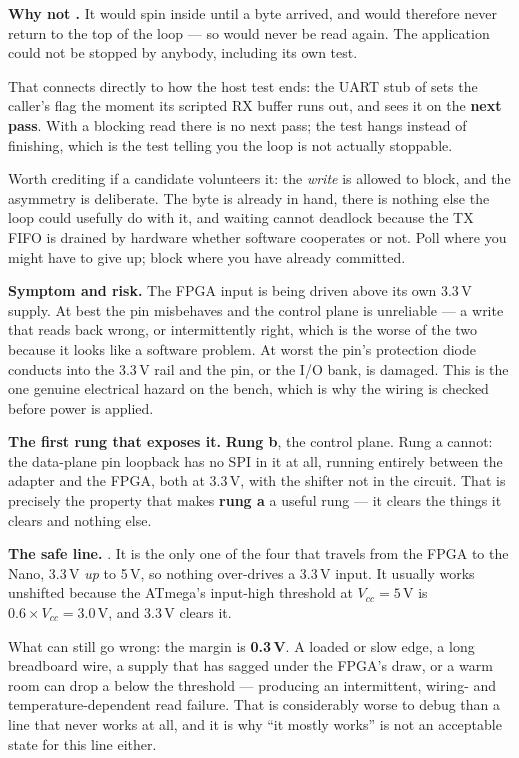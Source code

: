 \textbf{Why not .} It would spin inside  until a byte
arrived, and would therefore never return to the top of the loop --- so  would never be
read again. The application could not be stopped by anybody, including its own test.

That connects directly to how the host test ends: the UART stub of  sets the caller's
 flag  the moment its scripted RX buffer runs out, and  sees it on
the \textbf{next pass}. With a blocking read there is no next pass; the test hangs instead of
finishing, which is the test telling you the loop is not actually stoppable. 

Worth crediting if a candidate volunteers it: the \emph{write} is allowed to block, and the asymmetry
is deliberate. The byte is already in hand, there is nothing else the loop could usefully do with
it, and waiting cannot deadlock because the TX FIFO is drained by hardware whether software
cooperates or not. Poll where you might have to give up; block where you have already committed.

\textbf{Symptom and risk.} The FPGA input is being driven above its own 3.3\,V supply. At best the
pin misbehaves and the control plane is unreliable --- a  write that reads back wrong,
or intermittently right, which is the worse of the two because it looks like a software problem. At
worst the pin's protection diode conducts into the 3.3\,V rail and the pin, or the I/O bank, is
damaged. This is the one genuine electrical hazard on the bench, which is why the wiring is checked
before power is applied.

\textbf{The first rung that exposes it.} \textbf{Rung b}, the control plane. Rung a cannot: the
data-plane pin loopback has no SPI in it at all, running entirely between the adapter and the FPGA,
both at 3.3\,V, with the shifter not in the circuit. That is precisely the property that makes
\textbf{rung a} a useful rung --- it clears the things it clears and nothing else. 

\textbf{The safe line.} \textbf{}. It is the only one of the four that travels from the
FPGA to the Nano, 3.3\,V \emph{up} to 5\,V, so nothing over-drives a 3.3\,V input. It usually works
unshifted because the ATmega's input-high threshold at $V_{cc} = 5$\,V is $0.6 \times V_{cc} =
3.0$\,V, and 3.3\,V clears it.

What can still go wrong: the margin is \textbf{0.3\,V}. A loaded or slow edge, a long breadboard
wire, a supply that has sagged under the FPGA's draw, or a warm room can drop a  below the
threshold --- producing an intermittent, wiring- and temperature-dependent read failure. That is
considerably worse to debug than a line that never works at all, and it is why ``it mostly works''
is not an acceptable state for this line either. 
